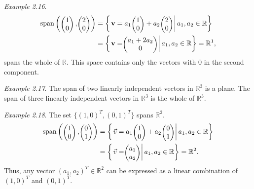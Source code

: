 \documentclass[
  letterpaper,
  DIV=11,
  numbers=noendperiod]{scrartcl}
\theoremstyle{remark}
\begin{document}
\emph{Example 2.16}. \[\begin{aligned}
{\rm span}\left(\scriptscriptstyle \begin{pmatrix}   1\\0  \end{pmatrix} \textstyle,\scriptscriptstyle \begin{pmatrix}   2\\0  \end{pmatrix} \textstyle\right) & = \left\{ \left. {\bf v}  =a_1 \scriptscriptstyle \begin{pmatrix}   1\\0  \end{pmatrix} \textstyle + a_2 \scriptscriptstyle \begin{pmatrix}   2\\0  \end{pmatrix} \textstyle\right| a_1,a_2 \in \mathbb{R} \right\} \\
&=  \left\{ \left.{\bf v} =  \scriptscriptstyle \begin{pmatrix}   a_1+2a_2 \\ 0  \end{pmatrix} \textstyle \right| a_1,a_2 \in \mathbb{R} \right\}  =  \mathbb{R}^{1},
\end{aligned}\] spans the whole of \(\mathbb{R}\). This space contains
only the vectors with 0 in the second component.

\emph{Example 2.17}. The span of two linearly independent vectors in
\(\mathbb{R}^{3}\) is a plane. The span of three linearly independent
vectors in \(\mathbb{R}^{3}\) is the whole of \(\mathbb{R}^{3}\).

\emph{Example 2.18}. The set \(\{(1,0)^{T},(0,1)^{T}\}\) spans
\(\mathbb{R}^{2}\). \[\begin{aligned}
{\rm span}\left(\scriptscriptstyle \begin{pmatrix}   1\\0  \end{pmatrix} \textstyle,\scriptscriptstyle \begin{pmatrix}   0\\1  \end{pmatrix} \textstyle\right) & = \left\{ \left. \vec{v} = a_1 \scriptscriptstyle \begin{pmatrix}   1\\0  \end{pmatrix} \textstyle + a_2 \scriptscriptstyle \begin{pmatrix}   0\\1  \end{pmatrix} \textstyle\right| a_1,a_2 \in \mathbb{R} \right\} \\
& = \left\{ \left. \vec{v} = \scriptscriptstyle \begin{pmatrix}   a_1\\a_2  \end{pmatrix} \textstyle \right| a_1,a_2 \in \mathbb{R} \right\} =    \mathbb{R}^{2}. 
\end{aligned}\] Thus, any vector \((a_{1},a_{2})^{T}\in\mathbb{R}^{2}\)
can be expressed as a linear combination of \((1,0)^{T}\) and
\((0,1)^{T}\).
\end{document}
